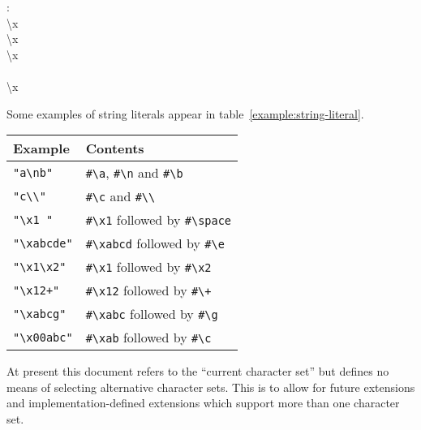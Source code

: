 \begin{optDefinition}
{\begin{syntax}
   : \\
   \>  \textbackslash{}x  \\
   \>  \textbackslash{}x   \\
   \>  \textbackslash{}x   \\
   \>\>   \\
   \>  \textbackslash{}x   \\
   \>\>   
\end{syntax}}%

Some examples of string literals appear in table~\ref{example:string-literal}.
%
\begin{example}
\label{example:string-literal}
\begin{center}
\begin{tabular}{|ll|}\hline
    Example & Contents\\\hline
    \verb+"a\nb"+ & \verb+#\a+, \verb+#\n+ and \verb+#\b+\\
    \verb+"c\\"+ & \verb+#\c+ and \verb+#\\+\\
    \verb+"\x1 "+ & \verb+#\x1+ followed by \verb+#\space+\\
    \verb+"\xabcde"+ & \verb+#\xabcd+ followed by \verb+#\e+\\
    \verb+"\x1\x2"+ & \verb+#\x1+ followed by \verb+#\x2+\\
    \verb-"\x12+"- & \verb+#\x12+ followed by \verb-#\+-\\
    \verb+"\xabcg"+ & \verb+#\xabc+ followed by \verb+#\g+\\
    \verb+"\x00abc"+ & \verb+#\xab+ followed by \verb+#\c+\\\hline
\end{tabular}
\end{center}
\end{example}
%
\begin{note}
    At present this document refers to the ``current character set'' but
    defines no means of selecting alternative character sets.  This is to
    allow for future extensions and implementation-defined extensions
    which support more than one character set.
\end{note}

\end{optDefinition}
